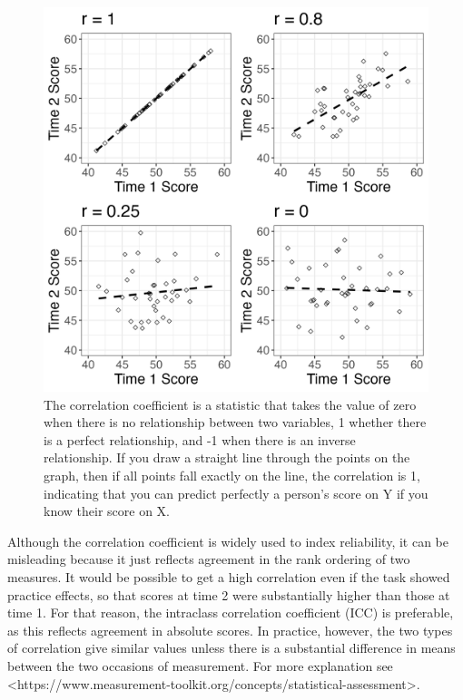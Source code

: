 \documentclass{krantz}
\begin{document}
\begin{figure}
\includegraphics[width=0.75\linewidth]{images_bw/correlationfig} \caption{The correlation coefficient is a statistic that takes the value of zero when there is no relationship between two variables, 1 whether there is a perfect relationship, and -1  when there is an inverse relationship. If you draw a straight line through the points on the graph, then if all points fall exactly on the line, the correlation is 1, indicating that you can predict perfectly a person's score on Y if you know their score on X.}\label{fig:correlationfig}
\end{figure}

\begin{tcolorbox}[colback=Black!5!lightgray,colframe=black!75!black,coltitle=white,title=Correlation as an index of reliability]\label{box:correlation}

Although the correlation coefficient is widely used to index reliability, it can be misleading because it just reflects agreement in the rank ordering of two measures. It would be possible to get a high correlation even if the task showed practice effects, so that scores at time 2 were substantially higher than those at time 1. For that reason, the intraclass correlation coefficient (ICC) is preferable, as this reflects agreement in absolute scores. In practice, however, the two types of correlation give similar values unless there is a substantial difference in means between the two occasions of measurement. For more explanation see <https://www.measurement-toolkit.org/concepts/statistical-assessment>.
\end{tcolorbox}
\end{document}
